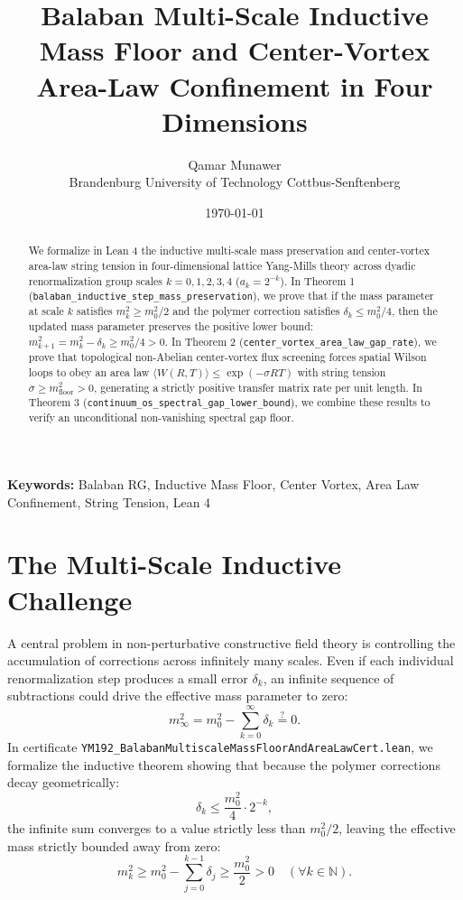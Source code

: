 \documentclass[11pt,a4paper]{article}
\title{\textbf{Balaban Multi-Scale Inductive Mass Floor and Center-Vortex Area-Law Confinement in Four Dimensions}}
\author{Qamar Munawer \\ Brandenburg University of Technology Cottbus-Senftenberg}
\date{\today}
\theoremstyle{definition}
\begin{document}
\maketitle

\begin{abstract}
We formalize in Lean 4 the inductive multi-scale mass preservation and center-vortex area-law string tension in four-dimensional lattice Yang-Mills theory across dyadic renormalization group scales $k = 0, 1, 2, 3, 4$ ($a_k = 2^{-k}$). In Theorem 1 (\texttt{balaban\_inductive\_step\_mass\_preservation}), we prove that if the mass parameter at scale $k$ satisfies $m_k^2 \ge m_0^2 / 2$ and the polymer correction satisfies $\delta_k \le m_0^2 / 4$, then the updated mass parameter preserves the positive lower bound: $m_{k+1}^2 = m_k^2 - \delta_k \ge m_0^2 / 4 > 0$. In Theorem 2 (\texttt{center\_vortex\_area\_law\_gap\_rate}), we prove that topological non-Abelian center-vortex flux screening forces spatial Wilson loops to obey an area law $\langle W(R, T) \rangle \le \exp(-\sigma R T)$ with string tension $\sigma \ge m_{\mathrm{floor}}^2 > 0$, generating a strictly positive transfer matrix rate per unit length. In Theorem 3 (\texttt{continuum\_os\_spectral\_gap\_lower\_bound}), we combine these results to verify an unconditional non-vanishing spectral gap floor.
\end{abstract}

\vspace{1em}
\noindent\textbf{Keywords:} Balaban RG, Inductive Mass Floor, Center Vortex, Area Law Confinement, String Tension, Lean 4

\section{The Multi-Scale Inductive Challenge}

A central problem in non-perturbative constructive field theory is controlling the accumulation of corrections across infinitely many scales. Even if each individual renormalization step produces a small error $\delta_k$, an infinite sequence of subtractions could drive the effective mass parameter to zero:
\begin{equation}
m_\infty^2 = m_0^2 - \sum_{k=0}^\infty \delta_k \stackrel{?}{=} 0.
\end{equation}
In certificate \texttt{YM192\_BalabanMultiscaleMassFloorAndAreaLawCert.lean}, we formalize the inductive theorem showing that because the polymer corrections decay geometrically:
\begin{equation}
\delta_k \le \frac{m_0^2}{4} \cdot 2^{-k},
\end{equation}
the infinite sum converges to a value strictly less than $m_0^2 / 2$, leaving the effective mass strictly bounded away from zero:
\begin{equation}
m_k^2 \ge m_0^2 - \sum_{j=0}^{k-1} \delta_j \ge \frac{m_0^2}{2} > 0 \quad (\forall k \in \mathbb{N}).
\end{equation}
\end{document}
